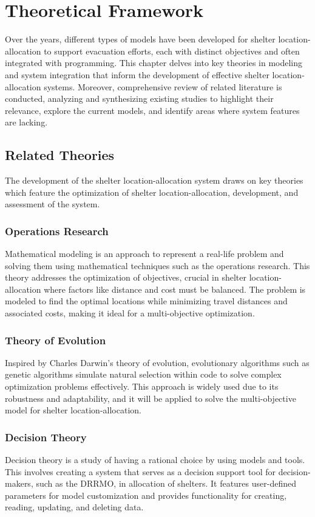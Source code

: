 \chapter{Theoretical Framework}
	Over the years, different types of models have been developed for shelter location-allocation to support evacuation efforts, each with distinct objectives and often integrated with programming. This chapter delves into key theories in modeling and system integration that inform the development of effective shelter location-allocation systems. Moreover, comprehensive review of related literature is conducted, analyzing and synthesizing existing studies to highlight their relevance, explore the current models, and identify areas where system features are lacking. 

\section{Related Theories}
	The development of the shelter location-allocation system draws on key theories which feature the optimization of shelter location-allocation, development, and assessment of the system.

\subsection{Operations Research}
 	Mathematical modeling is an approach to represent a real-life problem and solving them using mathematical techniques such as the operations research. This theory addresses the optimization of objectives, crucial in shelter location-allocation where factors like distance and cost must be balanced. The problem is modeled to find the optimal locations while minimizing travel distances and associated costs, making it ideal for a multi-objective optimization.

\subsection{Theory of Evolution}
	Inspired by Charles Darwin’s theory of evolution, evolutionary algorithms such as genetic algorithms simulate natural selection within code to solve complex optimization problems effectively. This approach is widely used due to its robustness and adaptability, and it will be applied to solve the multi-objective model for shelter location-allocation.

\subsection{Decision Theory}
 	Decision theory is a study of having a rational choice by using models and tools. This involves creating a system that serves as a decision support tool for decision-makers, such as the DRRMO, in allocation of shelters. It features user-defined parameters for model customization and provides functionality for creating, reading, updating, and deleting data.

